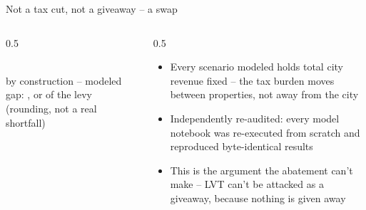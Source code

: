 \documentclass[aspectratio=169,11pt]{beamer}
\begin{document}
\begin{frame}{Not a tax cut, not a giveaway -- a swap}
\begin{columns}[T]
\begin{column}{0.5\linewidth}
\vspace{1.2em}
\begin{center}
\\[0.3em]
{\small\color{deckmuted} by construction -- modeled gap: \PhlRevenueGapDollars{}, or \PhlRevenueGapPct{} of the levy (rounding, not a real shortfall)}
\end{center}
\end{column}
\begin{column}{0.5\linewidth}
\vspace{1.0em}
\begin{itemize}
\item Every scenario modeled holds total city revenue fixed -- the tax burden moves between properties, not away from the city
\item Independently re-audited: every model notebook was re-executed from scratch and reproduced byte-identical results
\item This is the argument the abatement can't make -- LVT can't be attacked as a giveaway, because nothing is given away
\end{itemize}
\end{column}
\end{columns}
\end{frame}
\end{document}

